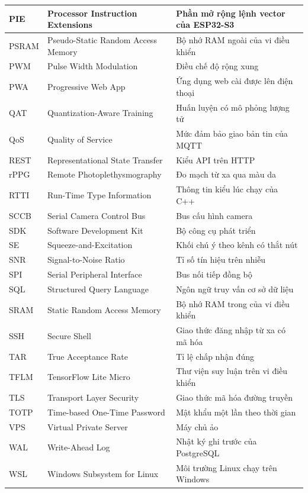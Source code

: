 \documentclass[../DoAn.tex]{subfiles}
\begin{document}
\begin{longtable}{|l|L{5.2cm}|L{6cm}|}
\hline
PIE & Processor Instruction Extensions & Phần mở rộng lệnh vector của ESP32-S3 \\
\hline
PSRAM & Pseudo-Static Random Access Memory & Bộ nhớ RAM ngoài của vi điều khiển \\
\hline
PWM & Pulse Width Modulation & Điều chế độ rộng xung \\
\hline
PWA & Progressive Web App & Ứng dụng web cài được lên điện thoại \\
\hline
QAT & Quantization-Aware Training & Huấn luyện có mô phỏng lượng tử \\
\hline
QoS & Quality of Service & Mức đảm bảo giao bản tin của MQTT \\
\hline
REST & Representational State Transfer & Kiểu API trên HTTP \\
\hline
rPPG & Remote Photoplethysmography & Đo mạch từ xa qua màu da \\
\hline
RTTI & Run-Time Type Information & Thông tin kiểu lúc chạy của C++ \\
\hline
SCCB & Serial Camera Control Bus & Bus cấu hình camera \\
\hline
SDK & Software Development Kit & Bộ công cụ phát triển \\
\hline
SE & Squeeze-and-Excitation & Khối chú ý theo kênh có thắt nút \\
\hline
SNR & Signal-to-Noise Ratio & Tỉ số tín hiệu trên nhiễu \\
\hline
SPI & Serial Peripheral Interface & Bus nối tiếp đồng bộ \\
\hline
SQL & Structured Query Language & Ngôn ngữ truy vấn cơ sở dữ liệu \\
\hline
SRAM & Static Random Access Memory & Bộ nhớ RAM trong của vi điều khiển \\
\hline
SSH & Secure Shell & Giao thức đăng nhập từ xa có mã hóa \\
\hline
TAR & True Acceptance Rate & Tỉ lệ chấp nhận đúng \\
\hline
TFLM & TensorFlow Lite Micro & Thư viện suy luận trên vi điều khiển \\
\hline
TLS & Transport Layer Security & Giao thức mã hóa đường truyền \\
\hline
TOTP & Time-based One-Time Password & Mật khẩu một lần theo thời gian \\
\hline
VPS & Virtual Private Server & Máy chủ ảo \\
\hline
WAL & Write-Ahead Log & Nhật ký ghi trước của PostgreSQL \\
\hline
WSL & Windows Subsystem for Linux & Môi trường Linux chạy trên Windows \\
\hline
\end{longtable}
\end{document}
